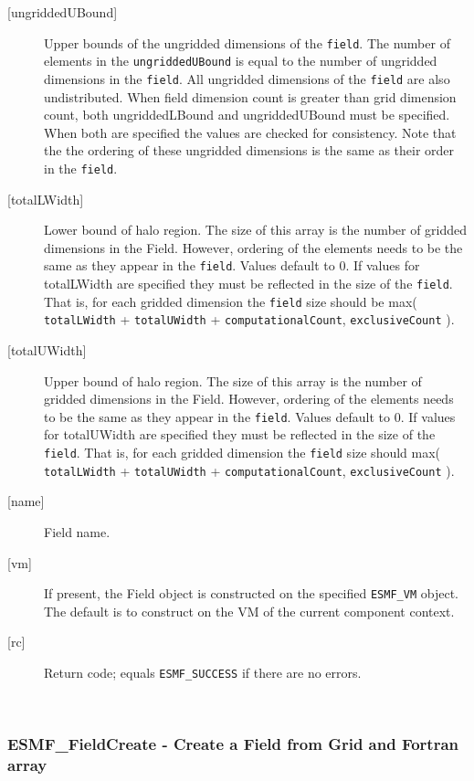 \begin{description}
   \item [{[ungriddedUBound]}]
   Upper bounds of the ungridded dimensions of the {\tt field}.
   The number of elements in the {\tt ungriddedUBound} is equal to the number of ungridded
   dimensions in the {\tt field}. All ungridded dimensions of the
   {\tt field} are also undistributed. When field dimension count is
   greater than grid dimension count, both ungriddedLBound and ungriddedUBound
   must be specified. When both are specified the values are checked
   for consistency. Note that the the ordering of
   these ungridded dimensions is the same as their order in the {\tt field}.
   \item [{[totalLWidth]}]
   Lower bound of halo region. The size of this array is the number
   of gridded dimensions in the Field. However, ordering of the elements
   needs to be the same as they appear in the {\tt field}. Values default
   to 0. If values for totalLWidth are specified they must be reflected in
   the size of the {\tt field}. That is, for each gridded dimension the
   {\tt field} size should be max( {\tt totalLWidth} + {\tt totalUWidth}
   + {\tt computationalCount}, {\tt exclusiveCount} ).
   \item [{[totalUWidth]}]
   Upper bound of halo region. The size of this array is the number
   of gridded dimensions in the Field. However, ordering of the elements
   needs to be the same as they appear in the {\tt field}. Values default
   to 0. If values for totalUWidth are specified they must be reflected in
   the size of the {\tt field}. That is, for each gridded dimension the
   {\tt field} size should max( {\tt totalLWidth} + {\tt totalUWidth}
   + {\tt computationalCount}, {\tt exclusiveCount} ).
   \item [{[name]}]
   Field name.
   \item[{[vm]}]
   If present, the Field object is constructed on the specified
   {\tt ESMF\_VM} object. The default is to construct on the VM of the
   current component context.
   \item [{[rc]}]
   Return code; equals {\tt ESMF\_SUCCESS} if there are no errors.
   \end{description} 
 
\mbox{}\hrulefill\ 
 
\subsubsection [ESMF\_FieldCreate] {ESMF\_FieldCreate - Create a Field from Grid and Fortran array }


